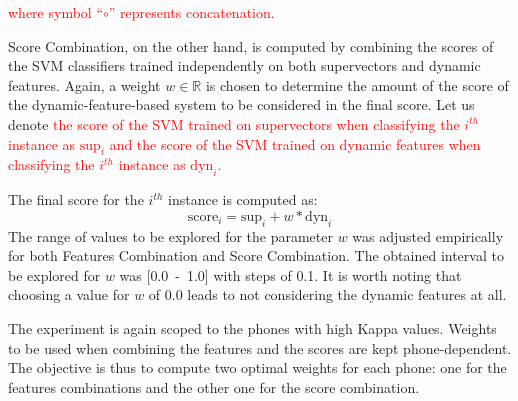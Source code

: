 \textcolor{red}{where symbol ``$\circ$'' represents concatenation.}

Score Combination, on the other hand, is computed by combining the scores
of the SVM classifiers trained independently on both supervectors and dynamic features.
Again, a weight $w \in \mathbb{R}$
is chosen to determine the amount of the score of the dynamic-feature-based system to be considered
in the final score. Let us denote
\textcolor{red}{
the score of the SVM trained on supervectors when classifying the $i^{th}$ instance
as $\text{sup}_{i}$ and the score of the SVM trained on dynamic features
when classifying the $i^{th}$ instance as
$\text{dyn}_{i}$.
}

The final score for the
$i^{th}$ instance is computed as:
\begin{equation}
	\text{score}_{i} = \text{sup}_{i} + w * \text{dyn}_{i}
\end{equation}
The range of values to be explored for the parameter $w$ was adjusted empirically for both
Features Combination and Score Combination. The obtained interval to be explored for $w$ was
\mbox{[0.0 - 1.0]} with steps of 0.1. It is worth noting that choosing
a value for $w$ of 0.0 leads to not considering the dynamic features at all.

The experiment is again scoped to the phones with high Kappa values.
Weights to be used when combining the features and the scores are kept phone-dependent.
The objective is thus to compute two optimal weights for each phone:
one for the features combinations and the other one for the score combination.



